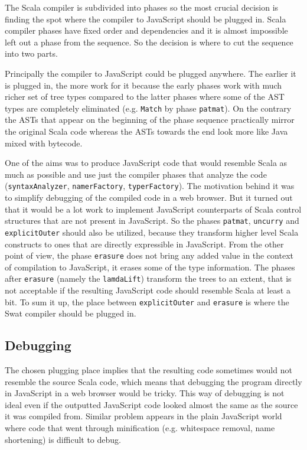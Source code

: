\documentclass[12pt,a4paper]{report}
\begin{document}
The Scala compiler is subdivided into phases so the most crucial decision is finding the spot where the compiler to JavaScript should be plugged in. Scala compiler phases have fixed order and dependencies and it is almost impossible left out a phase from the sequence. So the decision is where to cut the sequence into two parts.

Principally the compiler to JavaScript could be plugged anywhere. The earlier it is plugged in, the more work for it because the early phases work with much richer set of tree types compared to the latter phases where some of the AST types are completely eliminated (e.g. \texttt{Match} by phase \texttt{patmat}). On the contrary the ASTs that appear on the beginning of the phase sequence practically mirror the original Scala code whereas the ASTs towards the end look more like Java mixed with bytecode.

One of the aims was to produce JavaScript code that would resemble Scala as much as possible and use just the compiler phases that analyze the code (\texttt{syntaxAnalyzer}, \texttt{namerFactory}, \texttt{typerFactory}). The motivation behind it was to simplify debugging of the compiled code in a web browser. But it turned out that it would be a lot work to implement JavaScript counterparts of Scala control structures that are not present in JavaScript. So the phases \texttt{patmat}, \texttt{uncurry} and \texttt{explicitOuter} should also be utilized, because they transform higher level Scala constructs to ones that are directly expressible in JavaScript. From the other point of view, the phase \texttt{erasure} does not bring any added value in the context of compilation to JavaScript, it erases some of the type information. The phases after \texttt{erasure} (namely the \texttt{lamdaLift}) transform the trees to an extent, that is not acceptable if the resulting JavaScript code should resemble Scala at least a bit. To sum it up, the place between \texttt{explicitOuter} and \texttt{erasure} is where the Swat compiler should be plugged in.

\subsection{Debugging}

The chosen plugging place implies that the resulting code sometimes would not resemble the source Scala code, which means that debugging the program directly in JavaScript in a web browser would be tricky. This way of debugging is not ideal even if the outputted JavaScript code looked almost the same as the source it was compiled from. Similar problem appears in the plain JavaScript world where code that went through minification (e.g. whitespace removal, name shortening) is difficult to debug.
\end{document}

